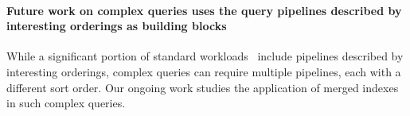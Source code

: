 \documentclass[sigconf, pdfa, nonacm]{acmart}
\begin{document}
\paragraph{Future work on complex queries uses the query pipelines described by interesting orderings as building blocks}

While a significant portion of standard workloads~\cite{leis2015job,tpch2017spec} include pipelines described by interesting orderings, complex queries can require multiple pipelines, each with a different sort order. Our ongoing work studies the application of merged indexes in such complex queries.


\clearpage


\end{document}
